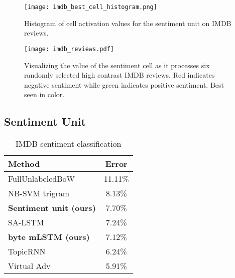 \documentclass{article}
\begin{document}
\begin{figure}[h]
\vskip 0.2in
\begin{center}
\centerline{\texttt{[image: imdb\_best\_cell\_histogram.png]}}
\caption{Histogram of cell activation values for the sentiment unit on IMDB reviews.}
\label{activation histogram}
\end{center}
\vskip -0.2in
\end{figure} 

\begin{figure}[h]
\vskip 0.2in
\begin{center}
\centerline{\texttt{[image: imdb\_reviews.pdf]}}
\caption{Visualizing the value of the sentiment cell as it processes six randomly selected high contrast IMDB reviews. Red indicates negative sentiment while green indicates positive sentiment. Best seen in color.}
\label{activation histogram}
\end{center}
\vskip -0.2in
\end{figure} 

\subsection{Sentiment Unit}

\begin{table}[h]
\caption{IMDB sentiment classification}
\label{imdb-sentiment}
\vskip 0.15in
\begin{center}
\begin{small}
\begin{sc}
\begin{tabular}{lc}
\hline
\abovespace\belowspace
Method & Error\\
\hline
\abovespace
FullUnlabeledBoW \cite{maas2011learning} & 11.11\%\\
NB-SVM trigram \cite{mesnil2014ensemble} & 8.13\%\\
\textbf{Sentiment unit (ours)} & 7.70\%\\
SA-LSTM \cite{dai2015semi} & 7.24\%\\
\textbf{byte mLSTM (ours)} & 7.12\%\\
TopicRNN \cite{dieng2016topicrnn} & 6.24\%\\
Virtual Adv \cite{miyato2016adversarial} & 5.91\%\\
\hline
\end{tabular}
\end{sc}
\end{small}
\end{center}
\vskip -0.1in
\end{table}
\end{document}
